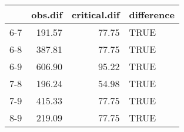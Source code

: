 \begin{table}[ht]
\centering
\begin{tabular}{rrrl}
  \hline
 & obs.dif & critical.dif & difference \\ 
  \hline
6-7 & 191.57 & 77.75 & TRUE \\ 
  6-8 & 387.81 & 77.75 & TRUE \\ 
  6-9 & 606.90 & 95.22 & TRUE \\ 
  7-8 & 196.24 & 54.98 & TRUE \\ 
  7-9 & 415.33 & 77.75 & TRUE \\ 
  8-9 & 219.09 & 77.75 & TRUE \\ 
   \hline
\end{tabular}
\end{table}
